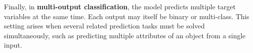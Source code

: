 \documentclass{article}
\begin{document}
Finally, in \textbf{multi-output classification}, the model predicts multiple target variables at the same time. Each output may itself be binary or multi-class. This setting arises when several related prediction tasks must be solved simultaneously, such as predicting multiple attributes of an object from a single input.




     
\end{document}
